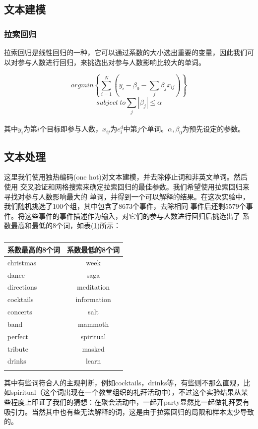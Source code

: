 \subsection{文本建模}

\subsubsection{拉索回归}

拉索回归是线性回归的一种，它可以通过系数的大小选出重要的变量\cite{tibshirani_regression_1996}，因此我们可以对参与人数进行回归，来挑选出对参与人数影响比较大的单词\cite{noauthor_predicting_nodate}。

\[
argmin\left\{\displaystyle\sum_{i=1}^N\left(y_i-\beta_0-\displaystyle\sum_j\beta_jx_{ij}\right)\right\}
\] \[subject\ to \displaystyle\sum_j|\beta_j|\leq\alpha\]\\

其中\(y_i\)为第\(i\)个目标即参与人数，\(x_{ij}\)为\(e_i^d\)中第\(j\)个单词。\(\alpha,\beta_0\)为预先设定的参数。
\subsection{文本处理}\label{3.2}

这里我们使用独热编码(one hot)对文本建模，并去除停止词和非英文单词。然后使用
交叉验证和网格搜索来确定拉索回归的最佳参数。我们希望使用拉索回归来寻找对参与人数影响最大的
单词，并得到一个可以解释的结果。在这次实验中，我们随机挑选了100个组，其中包含了8673个事件，去除相同
事件后还剩5579个事件。将这些事件的事件描述作为输入，对它们的参与人数进行回归后挑选出了
系数最高和最低的8个词，如表(\ref{t2})所示：

\begin{longtable}[HTBP]{@{}lc@{}}
\toprule
系数最高的8个词 & 系数最低的8个词\tabularnewline
\midrule
\endhead
christmas & week\tabularnewline
dance & saga\tabularnewline
directions & meditation\tabularnewline
cocktails & information\tabularnewline
concerts & salt\tabularnewline
band & mammoth\tabularnewline
perfect & spiritual\tabularnewline
tribute & masked\tabularnewline
drinks & learn\tabularnewline
\bottomrule
\caption{}
\label{t2}
\end{longtable}
  
其中有些词符合人的主观判断，例如cocktails，drinks等，有些则不那么直观，比如spiritual（这个词出现在一个教堂组织的礼拜活动中），不过这个实验结果从某些程度上印证了我们的猜想：在聚会活动中，一起开party显然比一起做礼拜要有吸引力。当然其中也有些无法解释的词，这是由于拉索回归的局限和样本太少导致的。

